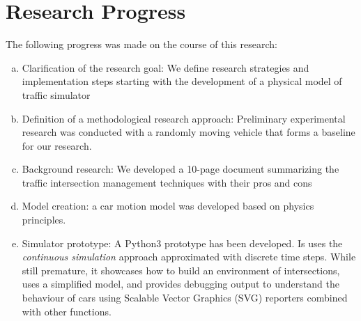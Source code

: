 \documentclass{book}
\newcommand{\jk}[1]{\todo[inline]{JK: #1}}
\begin{document}
\section{Research Progress}
The following progress was made on the course of this research:

\begin{enumerate}[(a)]
    \item Clarification of the research goal: We define research strategies and implementation steps starting with the development of a physical model of traffic simulator
    \item Definition of a methodological research approach: Preliminary experimental research was conducted with a randomly moving vehicle  that forms a baseline for our research.
    \item Background research: We developed a 10-page document summarizing the traffic intersection management techniques with their pros and cons
    \item Model creation: a car motion model was developed based on physics principles.
    \item Simulator prototype: A Python3 prototype has been developed. Is uses the \textit{continuous simulation} approach approximated with discrete time steps.
    While still premature, it showcases how to build an environment of intersections, uses a simplified model, and provides debugging output to understand the behaviour of cars using Scalable Vector Graphics (SVG) reporters combined with other functions.
\end{enumerate}




\end{document}
